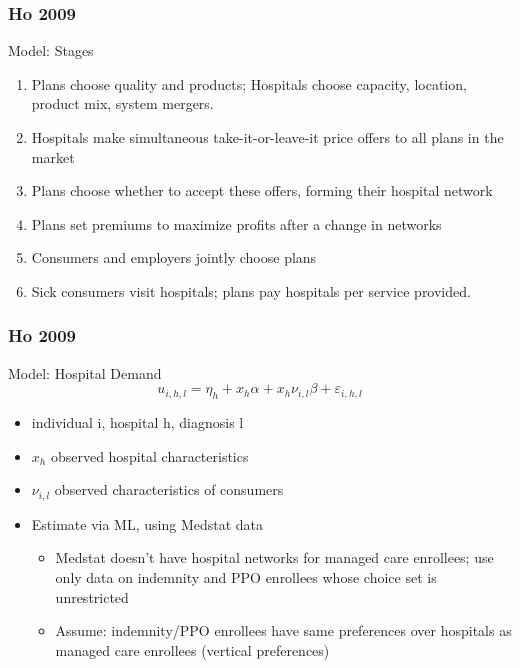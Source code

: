 \documentclass[xcolor=pdftex,dvipsnames,table,mathserif]{beamer}
\begin{document}
\begin{frame}
\frametitle{Ho 2009}

Model: Stages
\begin{enumerate}
\item Plans choose quality and products; Hospitals choose capacity, location, product mix, system mergers.
\item Hospitals make simultaneous take-it-or-leave-it price offers to all plans in the market
\item Plans choose whether to accept these offers, forming their hospital network
\item Plans set premiums to maximize profits after a change in networks
\item Consumers and employers jointly choose plans
\item Sick consumers visit hospitals; plans pay hospitals per service provided.
\end{enumerate}
\end{frame}
\begin{frame}
\frametitle{Ho 2009}

Model: Hospital Demand
\[
u_{i,h,l}=\eta _{h}+x_{h}\alpha +x_{h}\nu _{i,l}\beta +\varepsilon _{i,h,l}
\]

\begin{itemize}
\item individual i, hospital h, diagnosis l
\item $x_{h}$ observed hospital characteristics
\item $\nu_{i,l}$ observed characteristics of consumers
\item Estimate via ML, using Medstat data
\begin{itemize}
\item Medstat doesn't have hospital networks for managed care enrollees; use only data on indemnity and PPO enrollees whose choice set is unrestricted
\item Assume: indemnity/PPO enrollees have same preferences over hospitals as managed care enrollees (vertical preferences)
\end{itemize}
\end{itemize}

\end{frame}
\end{document}
